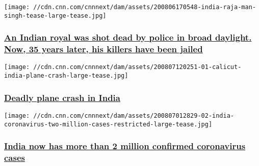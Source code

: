 \href{/2020/08/07/asia/india-maharaja-police-sentence-intl-dst-hnk/index.html}{}

\texttt{[image: //cdn.cnn.com/cnnnext/dam/assets/200806170548-india-raja-man-singh-tease-large-tease.jpg]}

\hypertarget{an-indian-royal-was-shot-dead-by-police-in-broad-daylight-now-35-years-later-his-killers-have-been-jailed}{%
\subsubsection{\texorpdfstring{\href{/2020/08/07/asia/india-maharaja-police-sentence-intl-dst-hnk/index.html}{An
Indian royal was shot dead by police in broad daylight. Now, 35 years
later, his killers have been
jailed}}{An Indian royal was shot dead by police in broad daylight. Now, 35 years later, his killers have been jailed}}\label{an-indian-royal-was-shot-dead-by-police-in-broad-daylight-now-35-years-later-his-killers-have-been-jailed}}

\href{/world/live-news/india-plane-crash-august-2020/index.html}{}

\texttt{[image: //cdn.cnn.com/cnnnext/dam/assets/200807120251-01-calicut-india-plane-crash-large-tease.jpg]}

\hypertarget{deadly-plane-crash-in-india}{%
\subsubsection{\texorpdfstring{\href{/world/live-news/india-plane-crash-august-2020/index.html}{Deadly
plane crash in
India}}{Deadly plane crash in India}}\label{deadly-plane-crash-in-india}}

\href{/2020/08/07/asia/india-coronavirus-two-million-intl-hnk/index.html}{}

\texttt{[image: //cdn.cnn.com/cnnnext/dam/assets/200807012829-02-india-coronavirus-two-million-cases-restricted-large-tease.jpg]}

\hypertarget{india-now-has-more-than-2-million-confirmed-coronavirus-cases}{%
\subsubsection{\texorpdfstring{\href{/2020/08/07/asia/india-coronavirus-two-million-intl-hnk/index.html}{India
now has more than 2 million confirmed coronavirus
cases}}{India now has more than 2 million confirmed coronavirus cases}}\label{india-now-has-more-than-2-million-confirmed-coronavirus-cases}}

